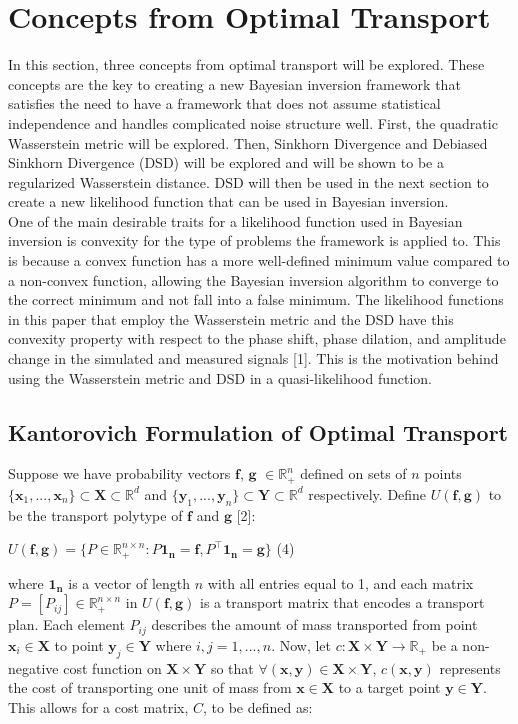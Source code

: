 \documentclass[botnum, fleqn]{unmeethesis}
\begin{document}
\chapter{Concepts from Optimal Transport}
In this section, three concepts from optimal transport will be explored. These concepts are the key to creating a new Bayesian inversion framework that satisfies the need to have a framework that does not assume statistical independence and handles complicated noise structure well. First, the quadratic Wasserstein metric will be explored. Then, Sinkhorn Divergence and Debiased Sinkhorn Divergence (DSD) will be explored and will be shown to be a regularized Wasserstein distance. DSD will then be used in the next section to create a new likelihood function that can be used in Bayesian inversion.\\
One of the main desirable traits for a likelihood function used in Bayesian inversion is convexity for the type of problems the framework is applied to. This is because a convex function has a more well-defined minimum value compared to a non-convex function, allowing the Bayesian inversion algorithm to converge to the correct minimum and not fall into a false minimum. The likelihood functions in this paper that employ the Wasserstein metric and the DSD have this convexity property with respect to the phase shift, phase dilation, and amplitude change in the simulated and measured signals [1]. This is the motivation behind using the Wasserstein metric and DSD in a quasi-likelihood function. 


\section{\label{section:Kantorovich Formulation of Optimal Transport}Kantorovich Formulation of Optimal Transport}
Suppose we have probability vectors $\bm{f}$, $\bm{g}$ $\in \mathbb{R}_+^n$ defined on sets of $n$ points\\ $\{ \bm{x}_1,...,\bm{x}_n \}\subset \bm{X}\subset \mathbb{R}^d$ and $\{\bm{y}_1,...,\bm{y}_n \}\subset \bm{Y}\subset \mathbb{R}^d$ respectively. Define $U(\bm{f},\bm{g})$ to be the transport polytype of $\bm{f}$ and $\bm{g}$ [2]:

\hspace{\fill} $U(\bm{f},\bm{g})=\{P\in \mathbb{R}_+^{n\times n}:P \bm{1_n} =\bm{f}, P^{\top}\bm{1_n}=\bm{g} \}$\hspace{\fill} \normalsize (4)

where $\bm{1_n}$ is a vector of length $n$ with all entries equal to 1, and each matrix $P=[P_{ij}]\in \mathbb{R}_+^{n\times n}$ in $U(\bm{f},\bm{g})$ is a transport matrix that encodes a transport plan. Each element $P_{ij}$ describes the amount of mass transported from point $\bm{x}_i\in \bm{X}$ to point $\bm{y}_j\in \bm{Y}$ where $i,j=1,...,n$. Now, let $c:\bm{X}\times\bm{Y}\rightarrow \mathbb{R}_+$ be a non-negative cost function on $\bm{X}\times\bm{Y}$ so that $\forall (\bm{x},\bm{y})\in \bm{X}\times \bm{Y}$, $c(\bm{x},\bm{y})$ represents the cost of transporting one unit of mass from $\bm{x}\in\bm{X}$ to a target point $\bm{y}\in\bm{Y}$. This allows for a cost matrix, $C$, to be defined as:
\end{document}
